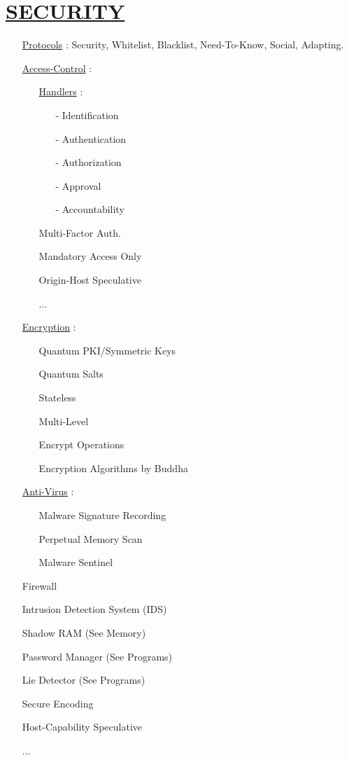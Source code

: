 \documentclass[11pt]{article}
\begin{document}
\section*{\ul{SECURITY}}
\begin{enumerate}
	\item[] \ul{Protocols} : Security, Whitelist, Blacklist, Need-To-Know, Social, Adapting.
	
	\item[] \ul{Access-Control} :
	\begin{enumerate}
		\item[] \ul{Handlers} :
		\begin{enumerate}
			\item[-] Identification
			\item[-] Authentication
			\item[-] Authorization
			\item[-] Approval
			\item[-] Accountability
		\end{enumerate}
		\item[] Multi-Factor Auth.
		\item[] Mandatory Access Only
		\item[] Origin-Host Speculative
		\item[] ...
	\end{enumerate}
	
	\item[] \ul{Encryption} :
	\begin{enumerate}
		\item[] Quantum PKI/Symmetric Keys
		\item[] Quantum Salts
		\item[] Stateless
		\item[] Multi-Level
		\item[] Encrypt Operations
		\item[] Encryption Algorithms by Buddha
	\end{enumerate}
	
	\item[] \ul{Anti-Virus} :
	\begin{enumerate}
		\item[] Malware Signature Recording
		\item[] Perpetual Memory Scan
		\item[] Malware Sentinel
	\end{enumerate}

	\item[] Firewall
	\item[] Intrusion Detection System (IDS)
	\item[] Shadow RAM (See Memory)
	\item[] Password Manager (See Programs)
	\item[] Lie Detector (See Programs)
	\item[] Secure Encoding
	\item[] Host-Capability Speculative
	\item[] ...
\end{enumerate}
\end{document}
